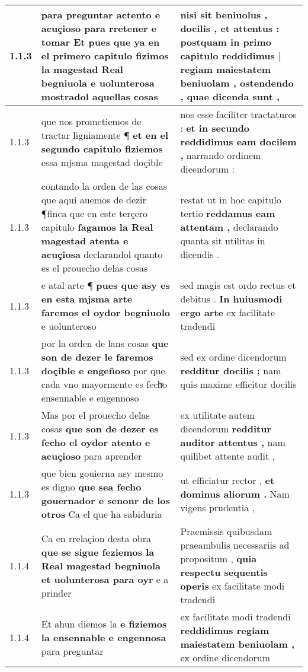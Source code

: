 \begin{tabular}{|p{1cm}|p{6.5cm}|p{6.5cm}|}
1.1.3 & para preguntar actento e acuçioso para rretener e tomar Et \textbf{ pues que ya en el primero capitulo fizimos la magestad Real begniuola } e uolunterosa mostradol aquellas cosas & nisi sit beniuolus , docilis , et attentus : \textbf{ postquam in primo capitulo reddidimus | regiam maiestatem beniuolam , } ostendendo , quae dicenda sunt , \\\hline
1.1.3 & que nos prometiemos de tractar ligniamente ¶ \textbf{ et en el segundo capitulo fiziemos } essa mjsma magestad doçible & nos esse faciliter tractaturos : \textbf{ et in secundo reddidimus eam docilem , } narrando ordinem dicendorum : \\\hline
1.1.3 & contando la orden de las cosas que aqui auemos de dezir ¶finca que en este terçero capitulo \textbf{ fagamos la Real magestad atenta e acuçiosa } declarandol quanto es el prouecho delas cosas & restat ut in hoc capitulo tertio \textbf{ reddamus eam attentam , } declarando quanta sit utilitas in dicendis . \\\hline
1.1.3 & e atal arte ¶ \textbf{ pues que asy es en esta mjsma arte faremos el oydor begniuolo } e uolunteroso & sed magis est ordo rectus et debitus . \textbf{ In huiusmodi ergo arte } ex facilitate tradendi \\\hline
1.1.3 & por la orden de lans cosas \textbf{ que son de dezer le faremos doçible e engeñoso } por que cada vno mayormente es fechͣo ensennable e engennoso & sed ex ordine dicendorum \textbf{ redditur docilis ; } nam quis maxime efficitur docilis \\\hline
1.1.3 & Mas por el prouecho delas cosas \textbf{ que son de dezer es fecho el oydor atento e acuçioso } para aprender & ex utilitate autem dicendorum \textbf{ redditur auditor attentus , } nam quilibet attente audit , \\\hline
1.1.3 & que bien gouierna asy mesmo es digno \textbf{ que sea fecho gouernador e senonr de los otros } Ca el que ha sabiduria & ut efficiatur rector , \textbf{ et dominus aliorum . } Nam vigens prudentia , \\\hline
1.1.4 & Ca en rrelaçion desta obra \textbf{ que se sigue feziemos la Real magestad begniuola et uolunterosa para oyr } e a prinder & Praemissis quibusdam praeambulis necessariis ad propositum , \textbf{ quia respectu sequentis operis } ex facilitate modi tradendi \\\hline
1.1.4 & Et ahun diemos la \textbf{ e fiziemos la ensennable e engennosa } para preguntar & ex facilitate modi tradendi \textbf{ reddidimus regiam maiestatem beniuolam , } ex ordine dicendorum \\\hline

\end{tabular}
